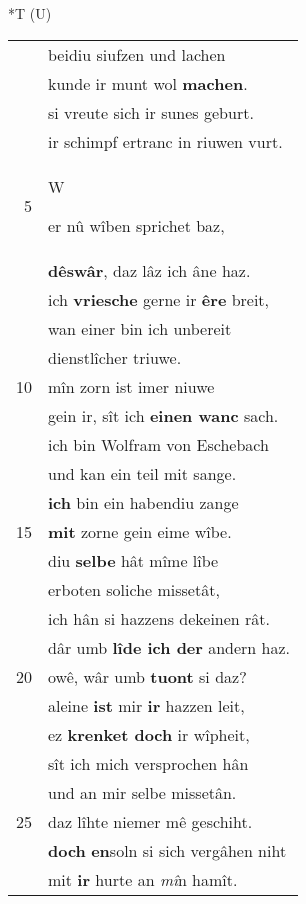 \documentclass[8pt,a4paper,notitlepage]{article}
\begin{document}
\begin{table}[ht]
\begin{minipage}[t]{0.5\linewidth}
\end{minipage}
\hspace{0.5cm}
\begin{minipage}[t]{0.5\linewidth}
\small
\begin{center}*T (U)
\end{center}
\begin{tabular}{rl}
 & beidiu siufzen und lachen\\ 
 & kunde ir munt wol \textbf{machen}.\\ 
 & si vreute sich ir sunes geburt.\\ 
 & ir schimpf ertranc in riuwen vurt.\\ 
5 & \begin{large}W\end{large}er nû wîben sprichet baz,\\ 
 & \textbf{dêswâr}, daz lâz ich âne haz.\\ 
 & ich \textbf{vriesche} gerne ir \textbf{êre} breit,\\ 
 & wan einer bin ich unbereit\\ 
 & dienstlîcher triuwe.\\ 
10 & mîn zorn ist imer niuwe\\ 
 & gein ir, sît ich \textbf{einen wanc} sach.\\ 
 & ich bin Wolfram von Eschebach\\ 
 & und kan ein teil mit sange.\\ 
 & \textbf{ich} bin ein habendiu zange\\ 
15 & \textbf{mit} zorne gein eime wîbe.\\ 
 & diu \textbf{selbe} hât mîme lîbe\\ 
 & erboten soliche missetât,\\ 
 & ich hân si hazzens dekeinen rât.\\ 
 & dâr umb \textbf{lîde ich der} andern haz.\\ 
20 & owê, wâr umb \textbf{tuont} si daz?\\ 
 & aleine \textbf{ist} mir \textbf{ir} hazzen leit,\\ 
 & ez \textbf{krenket doch} ir wîpheit,\\ 
 & sît ich mich versprochen hân\\ 
 & und an mir selbe missetân.\\ 
25 & daz lîhte niemer mê geschiht.\\ 
 & \textbf{doch} \textbf{en}soln si sich vergâhen niht\\ 
 & mit \textbf{ir} hurte an \textit{mî}n hamît.\\ 

\end{tabular}
\end{minipage}
\end{table}
\end{document}
